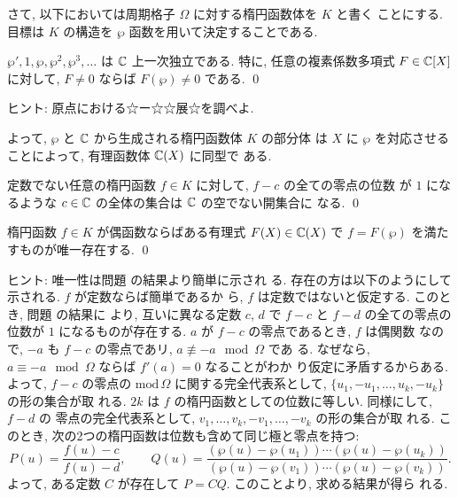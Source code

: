\documentclass[12pt,twoside]{jarticle}
\def\pe{\wp}
\def\C{{\Bbb C}} %
\begin{document}
\bigskip

さて, 以下においては周期格子 $\Omega$ に対する楕円函数体を $K$ と書く
ことにする. 目標は $K$ の構造を $\pe$ 函数を用いて決定することである.

\begin{question}\label{q:C(pe)}\qstar{*}
  $\pe', 1,\pe,\pe^2,\pe^3,\ldots$ は $\C$ 上一次独立である. 
  特に, 任意の複素係数多項式 $F\in\C[X]$ に対して, $F\ne0$ ならば %
  $F(\pe)\ne 0$ である. \qed
\end{question}

\noindent ヒント: 原点における☆ー☆☆展☆を調べよ. 

\medskip

\noindent よって, $\pe$ と $\C$ から生成される楕円函数体 $K$ の部分体
は $X$ に $\pe$ を対応させることによって, 有理函数体 $\C(X)$ に同型で
ある.

\begin{question}\label{q:f-c}\qstar{*}
  定数でない任意の楕円函数 $f\in K$ に対して, $f-c$ の全ての零点の位数
  が $1$ になるような $c\in\C$ の全体の集合は $\C$ の空でない開集合に
  なる. \qed
\end{question}

\begin{question}\label{q:evenf}\qstar{*}
  楕円函数 $f\in K$ が偶函数ならばある有理式 $F(X)\in\C(X)$ で %
  $f=F(\pe)$ を満たすものが唯一存在する. \qed
\end{question}

\noindent ヒント: 唯一性は問題  の結果より簡単に示され
る. 存在の方は以下のようにして示される. $f$ が定数ならば簡単であるか
ら, $f$ は定数ではないと仮定する. このとき, 問題  の結果に
より, 互いに異なる定数 $c$, $d$ で $f-c$ と $f-d$ の全ての零点の位数が %
$1$ になるものが存在する. $a$ が $f-c$ の零点であるとき, $f$ は偶関数
なので, $-a$ も $f-c$ の零点であリ, $a\not\equiv -a \mod \Omega$ であ
る. なぜなら, $a\equiv -a \mod\Omega$ ならば $f'(a)=0$ なることがわか
り仮定に矛盾するからある. よって, $f-c$ の零点の $\text{mod}\,\Omega$ 
に関する完全代表系として, $\{u_1,-u_1,\dots,u_k,-u_k\}$ の形の集合が取
れる. $2k$ は $f$ の楕円函数としての位数に等しい. 同様にして, $f-d$ の
零点の完全代表系として, $v_1,\dots,v_k,-v_1,\dots,-v_k$ の形の集合が取
れる. このとき, 次の2つの楕円函数は位数も含めて同じ極と零点を持つ:
\[
  P(u)=\frac{f(u)-c}{f(u)-d},
  \qquad
  Q(u)=
  \frac{(\pe(u)-\pe(u_1))\cdots(\pe(u)-\pe(u_k))}
       {(\pe(u)-\pe(v_1))\cdots(\pe(u)-\pe(v_k))}.
\]
よって, ある定数 $C$ が存在して $P=CQ$. このことより, 求める結果が得ら
れる.
\end{document}

